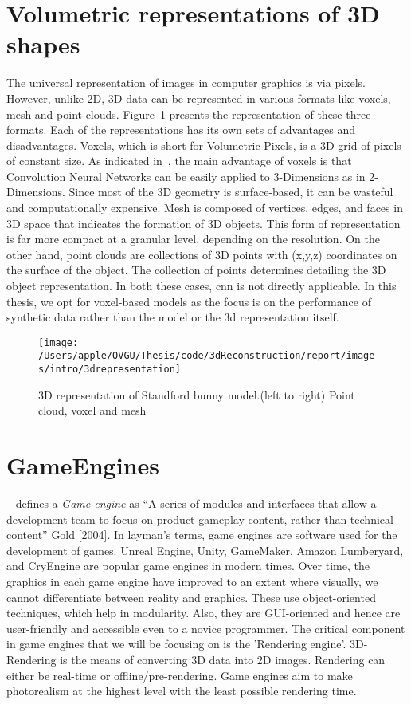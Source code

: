 \section{Volumetric representations of 3D shapes} \label{sec:Volumetric representation}
The universal representation of images in computer graphics is via pixels.
However, unlike 2D, 3D data can be represented in various formats like voxels, mesh and point clouds.
Figure~\ref{fig:3d representation} presents the representation of these three formats.
Each of the representations has its own sets of advantages and disadvantages.
Voxels, which is short for Volumetric Pixels, is a 3D grid of pixels of constant size.
As indicated in~\cite{li2016fpnn}, the main advantage of voxels is that Convolution Neural Networks can be easily applied to 3-Dimensions as in 2-Dimensions.
Since most of the 3D geometry is surface-based, it can be wasteful and computationally expensive. Mesh is composed of vertices, edges, and faces in 3D space that indicates the formation of 3D objects. This form of representation is far more compact at a granular level, depending on the resolution. On the other hand, point clouds are collections of 3D points with (x,y,z) coordinates on the surface of the object. The collection of points determines detailing the 3D object representation.
In both these cases, \gls{cnn} is not directly applicable.
In this thesis, we opt for voxel-based models as the focus is on the performance of synthetic data rather than the model or the 3d representation itself.

\begin{figure}
    \centering
    \texttt{[image: /Users/apple/OVGU/Thesis/code/3dReconstruction/report/images/intro/3drepresentation]}
    \caption{3D representation of Standford bunny model.(left to right) Point cloud, voxel and mesh~\cite{Hoang2019ADL}
    \label{fig:3d representation}}
\end{figure}

\section{GameEngines}\label{sec:gameengines}
~\cite{10.5555/983334} defines a \emph{Game engine} as  “A series of modules and interfaces that allow a development team to focus on product gameplay content,
rather than technical content” Gold [2004].
In layman’s terms, game engines are software used for the development of games.
Unreal Engine, Unity, GameMaker, Amazon Lumberyard, and CryEngine are popular game engines in modern times.
Over time, the graphics in each game engine have improved to an extent where visually, we cannot differentiate between reality and graphics.
These use object-oriented techniques, which help in modularity.
Also, they are GUI-oriented and hence are user-friendly and accessible even to a novice programmer.
The critical component in game engines that we will be focusing on is the ’Rendering engine’.
3D-Rendering is the means of converting 3D data into 2D images.
Rendering can either be real-time or offline/pre-rendering.
Game engines aim to make photorealism at the highest level with the least possible rendering time.


